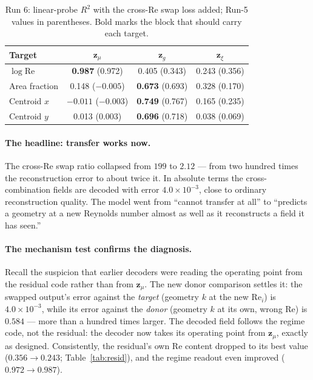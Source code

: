 \documentclass[11pt]{article}
\begin{document}
\begin{table}[htbp]
  \centering
  \caption{Run 6: linear-probe $R^2$ with the cross-Re swap loss added;
  Run-5 values in parentheses. Bold marks the block that should carry
  each target.}
  \label{tab:probes-run6}
  \begin{tabular}{lccc}
    \toprule
    Target & $\boldsymbol{z}_{\mu}$ & $\boldsymbol{z}_{g}$ & $\boldsymbol{z}_{\xi}$ \\
    \midrule
    $\log \mathrm{Re}$ & \textbf{0.987} (0.972) & 0.405 (0.343) & 0.243 (0.356) \\
    Area fraction      & 0.148 ($-0.005$)       & \textbf{0.673} (0.693) & 0.328 (0.170) \\
    Centroid $x$       & $-0.011$ ($-0.003$)    & \textbf{0.749} (0.767) & 0.165 (0.235) \\
    Centroid $y$       & 0.013 (0.003)          & \textbf{0.696} (0.718) & 0.038 (0.069) \\
    \bottomrule
  \end{tabular}
\end{table}

\paragraph{The headline: transfer works now.} The cross-Re swap ratio
collapsed from $199$ to $\mathbf{2.12}$ --- from two hundred times the
reconstruction error to about twice it. In absolute terms the
cross-combination fields are decoded with error $4.0 \times 10^{-3}$,
close to ordinary reconstruction quality. The model went from ``cannot
transfer at all'' to ``predicts a geometry at a new Reynolds number
almost as well as it reconstructs a field it has seen.''

\paragraph{The mechanism test confirms the diagnosis.} Recall the
suspicion that earlier decoders were reading the operating point from
the residual code rather than from $\boldsymbol{z}_{\mu}$. The new donor
comparison settles it: the swapped output's error against the
\emph{target} (geometry $k$ at the new $\mathrm{Re}_i$) is
$4.0 \times 10^{-3}$, while its error against the \emph{donor} (geometry
$k$ at its own, wrong Re) is $0.584$ --- more than a hundred times
larger. The decoded field follows the regime code, not the residual: the
decoder now takes its operating point from $\boldsymbol{z}_{\mu}$,
exactly as designed. Consistently, the residual's own Re content dropped
to its best value ($0.356 \to 0.243$; Table~\ref{tab:resid}), and the
regime readout even improved ($0.972 \to 0.987$).
\end{document}
